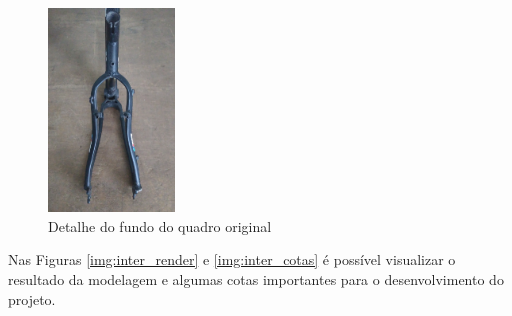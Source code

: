 	\newpage

	\graphicspath{{figuras/}}
	\begin{figure}[!htb]
		\centering
		\includegraphics[width=0.3\textwidth]{quadro_original_fundo.jpg}
		\caption{Detalhe do fundo do quadro original}
		\label{img:quadro_original_fundo}
	\end{figure}
	
	Nas Figuras \ref{img:inter_render} e \ref{img:inter_cotas} é possível visualizar  o resultado da modelagem e algumas cotas importantes para o desenvolvimento do projeto.
	
